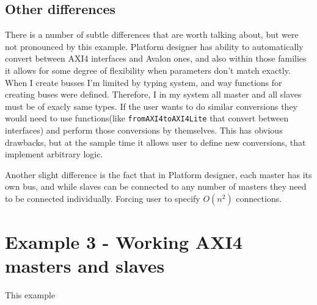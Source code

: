 \documentclass[12pt]{report}
\begin{document}
\subsection{Other differences}
There is a number of subtle differences that are worth talking about, but were not pronounced by this example.
Platform designer has ability to automatically convert between AXI4 interfaces and Avalon ones, and also within those families it allows for some degree of flexibility when parameters don't match exactly.
When I create busses I'm limited by typing system, and way functions for creating buses were defined. Therefore, I in my system all master and all slaves must be of exacly same types. If the user wants to do similar conversions they would need to use functions(like \verb!fromAXI4toAXI4Lite! that convert between interfaces) and perform those conversions by themselves. This has obvious drawbacks, but at the sample time it allows user to define new conversions, that implement arbitrary logic.
\par
Another slight difference is the fact that in Platform designer, each master has its own bus, and while slaves can be connected to any number of masters they need to be connected individually. Forcing user to specify $O(n^2)$ connections.
\section{Example 3 - Working AXI4 masters and slaves}
This example 
\end{document}
